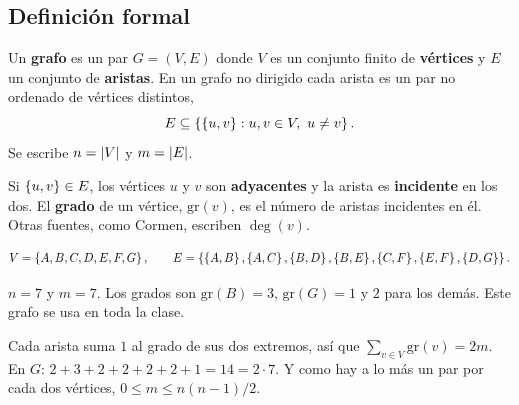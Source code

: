 \documentclass[11pt,letterpaper]{article}
\begin{document}
\subsection*{Definición formal}

\begin{definicion}[Grafo]
  Un \textbf{grafo} es un par $G = (V, E)$ donde $V$ es un conjunto
  finito de \textbf{vértices} y $E$ un conjunto de \textbf{aristas}.
  En un grafo no dirigido cada arista es un par no ordenado de
  vértices distintos,
  \[
    E \subseteq \left\{ \left\{ u, v \right\} : u, v \in V,\ u \neq v \right\} .
  \]
  Se escribe $n = \left\lvert V \right\rvert$ y $m = \left\lvert E \right\rvert$.
\end{definicion}

Si $\left\{ u, v \right\} \in E$, los vértices $u$ y $v$ son
\textbf{adyacentes} y la arista es \textbf{incidente} en los dos. El
\textbf{grado} de un vértice, $\text{gr}(v)$, es el número de aristas
incidentes en él. Otras fuentes, como Cormen, escriben $\deg(v)$.

\begin{ejemplo}
  \[
    V = \left\{ A, B, C, D, E, F, G \right\} , \qquad
    E = \left\{ \left\{ A,B \right\}, \left\{ A,C \right\}, \left\{ B,D \right\}, \left\{ B,E \right\},
             \left\{ C,F \right\}, \left\{ E,F \right\}, \left\{ D,G \right\} \right\} .
  \]
  \begin{center}
  \end{center}
  $n = 7$ y $m = 7$. Los grados son $\text{gr}(B) = 3$,
  $\text{gr}(G) = 1$ y $2$ para los demás. Este grafo se usa en toda
  la clase.
\end{ejemplo}

\begin{observacion}
  Cada arista suma $1$ al grado de sus dos extremos, así que
  $\sum_{v \in V} \text{gr}(v) = 2m$. En $G$:
  $2 + 3 + 2 + 2 + 2 + 2 + 1 = 14 = 2 \cdot 7$. Y como hay a lo más
  un par por cada dos vértices, $0 \leq m \leq n(n-1)/2$.
\end{observacion}

\end{document}
